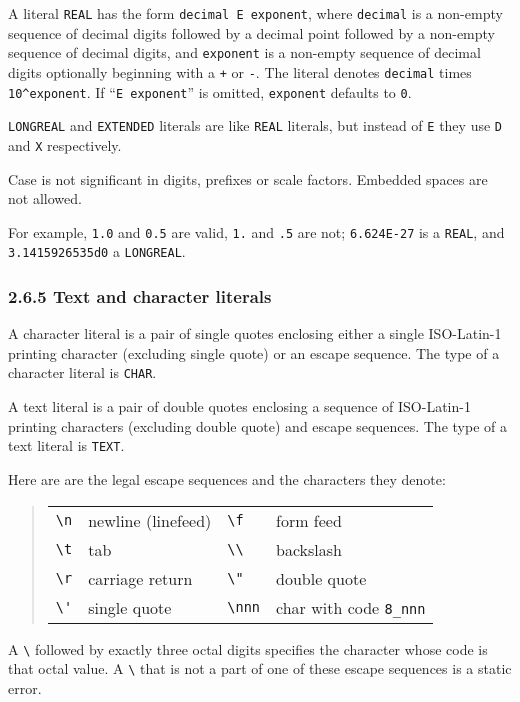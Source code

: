 \documentclass[10pt]{article}
\begin{document}
A literal \verb|REAL| has the form \verb|decimal E exponent|, where
\verb|decimal| is a non-empty sequence of decimal digits followed by a decimal
point followed by a non-empty sequence of decimal digits, and \verb|exponent|
is a non-empty sequence of decimal digits optionally beginning with a \verb|+|
or \verb|-|.  The literal denotes \verb|decimal| times \verb|10^exponent|.  If
``\verb|E exponent|'' is omitted, \verb|exponent| defaults to \verb|0|.

\verb|LONGREAL| and \verb|EXTENDED| literals are like \verb|REAL| literals,
but instead of \verb|E| they use \verb|D| and \verb|X| respectively.

Case is not significant in digits, prefixes or scale factors.  Embedded spaces
are not allowed.

For example, \verb|1.0| and \verb|0.5| are valid, \verb|1.| and \verb|.5| are
not; \verb|6.624E-27| is a \verb|REAL|, and \verb|3.1415926535d0| a
\verb|LONGREAL|.

\subsubsection*{2.6.5 Text and character literals}

A character literal is a pair of single quotes enclosing either a single
ISO-Latin-1 printing character (excluding single quote) or an escape sequence.
The type of a character literal is \verb|CHAR|.

A text literal is a pair of double quotes enclosing a sequence of ISO-Latin-1
printing characters (excluding double quote) and escape sequences.  The type
of a text literal is \verb|TEXT|.

Here are are the legal escape sequences and the characters they denote:
\begin{quote}
  \begin{tabular}{llll}
    \verb|\n| & newline (linefeed) & \verb|\f| & form feed \\
    \verb|\t| & tab                & \verb|\\| & backslash \\
    \verb|\r| & carriage return    & \verb|\"| & double quote \\
    \verb|\'| & single quote       & \verb|\nnn| & char with code \verb|8_nnn| \\
  \end{tabular}
\end{quote}
A \verb|\| followed by exactly three octal digits specifies the character
whose code is that octal value.  A \verb|\| that is not a part of one of these
escape sequences is a static error.
\end{document}
